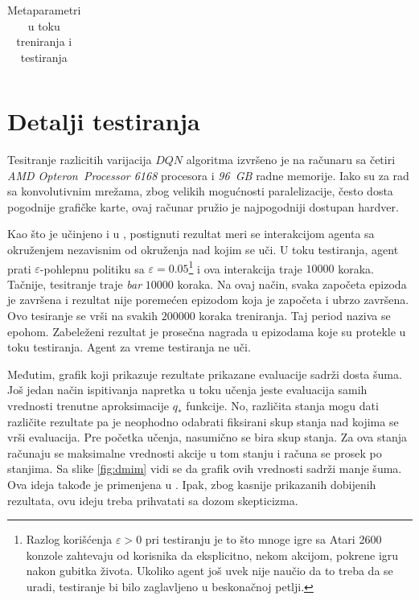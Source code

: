 \begin{table}
{\begin{tabularx}{\textwidth}{|l|c|X|}
\end{tabularx} }
\caption{Metaparametri u toku treniranja i testiranja}
\label{tbl:metaparametri}
\end{table}

\section{Detalji testiranja}
\label{sec:testiranje}
Tesitranje razlicitih varijacija $DQN$ algoritma izvršeno je na računaru sa četiri {\em AMD Opteron\texttrademark ~Processor 6168} procesora i {\em 96~GB} radne memorije. Iako su za rad sa konvolutivnim mrežama, zbog velikih mogućnosti paralelizacije, često dosta pogodnije grafičke karte, ovaj računar pružio je najpogodniji dostupan hardver. 
\par 
Kao što je učinjeno i u \cite{dqn_mnih}, postignuti rezultat meri se interakcijom agenta sa okruženjem nezavisnim od okruženja nad kojim se uči. U toku testiranja, agent prati $\varepsilon$-pohlepnu politiku sa $\varepsilon=0.05$\footnote{Razlog korišćenja $\varepsilon > 0$ pri testiranju je to što mnoge igre sa Atari 2600 konzole zahtevaju od korisnika da eksplicitno, nekom akcijom, pokrene igru nakon gubitka života. Ukoliko agent još uvek nije naučio da to treba da se uradi, testiranje bi bilo zaglavljeno u beskonačnoj petlji.} i ova interakcija traje $10000$ koraka. Tačnije, tesitranje traje {\em bar} $10000$ koraka. Na ovaj način, svaka započeta epizoda je završena i rezultat nije poremećen epizodom koja je započeta i ubrzo završena. Ovo tesiranje se vrši na svakih $200000$ koraka treniranja. Taj period naziva se epohom. Zabeleženi rezultat je prosečna nagrada u epizodama koje su protekle u toku testiranja. Agent za vreme testiranja ne uči.
\par 
Međutim, grafik koji prikazuje rezultate prikazane evaluacije sadrži dosta šuma. Još jedan način ispitivanja napretka u toku učenja jeste evaluacija samih vrednosti trenutne aproksimacije $q_*$ funkcije. No, različita stanja mogu dati različite rezultate pa je neophodno odabrati fiksirani skup stanja nad kojima se vrši evaluacija. Pre početka učenja, nasumično se bira skup stanja. Za ova stanja računaju se maksimalne vrednosti akcije u tom stanju i računa se prosek po stanjima. Sa slike \ref{fig:dmim} vidi se da grafik ovih vrednosti sadrži manje šuma. Ova ideja takođe je primenjena u \cite{dqn_mnih}. Ipak, zbog kasnije prikazanih dobijenih rezultata, ovu ideju treba prihvatati sa dozom skepticizma.
